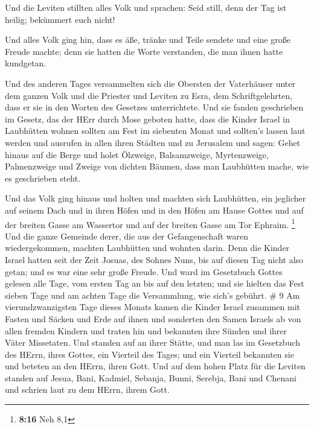  Und die Leviten stillten alles Volk und sprachen: Seid
still, denn der Tag ist heilig; bekümmert euch nicht!

 Und alles Volk ging hin, dass es äße, tränke und Teile
sendete und eine große Freude machte; denn sie hatten die Worte
verstanden, die man ihnen hatte kundgetan.

 Und des anderen Tages versammelten sich die Obersten der
Vaterhäuser unter dem ganzen Volk und die Priester und Leviten zu Esra,
dem Schriftgelehrten, dass er sie in den Worten des Gesetzes
unterrichtete.  Und sie fanden geschrieben im Gesetz, das
der HErr durch Mose geboten hatte, dass die Kinder Israel in Laubhütten
wohnen sollten am Fest im siebenten Monat  und sollten's
lassen laut werden und ausrufen in allen ihren Städten und zu Jerusalem
und sagen: Gehet hinaus auf die Berge und holet Ölzweige, Balsamzweige,
Myrtenzweige, Palmenzweige und Zweige von dichten Bäumen, dass man
Laubhütten mache, wie es geschrieben steht.

 Und das Volk ging hinaus und holten und machten sich
Laubhütten, ein jeglicher auf seinem Dach und in ihren Höfen und in den
Höfen am Hause Gottes und auf der breiten Gasse am Wassertor und auf der
breiten Gasse am Tor Ephraim. \footnote{\textbf{8:16} Neh 8,1}
 Und die ganze Gemeinde derer, die aus der Gefangenschaft
waren wiedergekommen, machten Laubhütten und wohnten darin. Denn die
Kinder Israel hatten seit der Zeit Josuas, des Sohnes Nuns, bis auf
diesen Tag nicht also getan; und es war eine sehr große Freude.
 Und ward im Gesetzbuch Gottes gelesen alle Tage, vom
ersten Tag an bis auf den letzten; und sie hielten das Fest sieben Tage
und am achten Tage die Versammlung, wie sich's gebührt. \# 9
 Am vierundzwanzigsten Tage dieses Monats kamen die Kinder
Israel zusammen mit Fasten und Säcken und Erde auf ihnen 
und sonderten den Samen Israels ab von allen fremden Kindern und traten
hin und bekannten ihre Sünden und ihrer Väter Missetaten. 
Und standen auf an ihrer Stätte, und man las im Gesetzbuch des HErrn,
ihres Gottes, ein Vierteil des Tages; und ein Vierteil bekannten sie und
beteten an den HErrn, ihren Gott.  Und auf dem hohen Platz
für die Leviten standen auf Jesua, Bani, Kadmiel, Sebanja, Bunni,
Serebja, Bani und Chenani und schrien laut zu dem HErrn, ihrem Gott.


